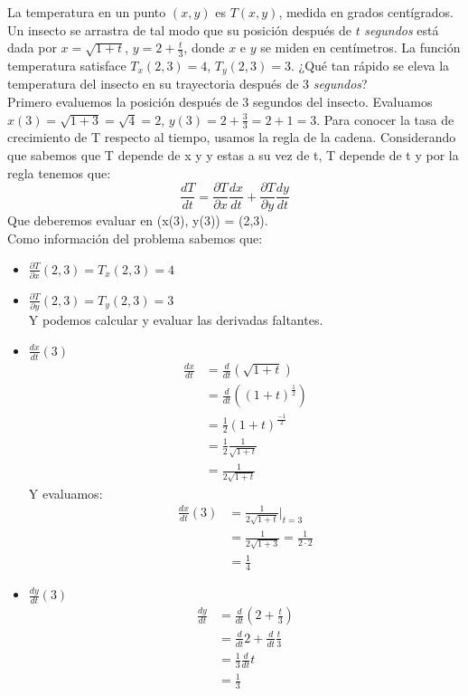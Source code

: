 \documentclass[12pt]{article}
\begin{document}
\begin{itemize}[format=\textbf]
La temperatura en un punto $(x, y)$ es $T(x, y)$, medida en grados centígrados. Un insecto se arrastra de tal modo que su posición después de $t$ \textit{segundos} está dada por $x =
\sqrt{1 + t}$, $y = 2 + \frac{t}{3}$, donde $x$ e $y$ se miden en centímetros. La función temperatura satisface $T_x(2, 3) = 4$, $T_y(2, 3) = 3$.
¿Qué tan rápido se eleva la temperatura del insecto en su trayectoria después de 3 \textit{segundos}?\\
Primero evaluemos la posición después de 3 segundos del insecto.
Evaluamos $x(3) =\sqrt{1 + 3} = \sqrt{4} = 2 $, $y(3) = 2 + \frac{3}{3} = 2+1=3 $. Para conocer la tasa de crecimiento de T respecto al tiempo, usamos la regla de la cadena. Considerando que sabemos que T depende de x y y estas a su vez de t, T depende de t y por la regla tenemos que:
\[
\frac{dT}{dt} = \frac{\partial T}{\partial x}\frac{dx}{dt}+ \frac{\partial T}{\partial y}\frac{dy}{dt}
\]
Que deberemos evaluar en (x(3), y(3)) = (2,3).\\
Como información del problema sabemos que:
\begin{itemize}
\item $\frac{\partial T}{\partial x}(2,3)= T_x(2, 3) = 4$
\item $ \frac{\partial T}{\partial y}(2,3) = T_y(2, 3) = 3 $\\
Y podemos calcular y evaluar las derivadas faltantes.
\item $\frac{dx}{dt}(3) $
    \begin{align*}
      \frac{dx}{dt} &= \frac{d}{dt} \left( \sqrt{1 + t} \right)  \\
      &=  \frac{d}{dt} \left( (1 + t)^{\frac{1}{2}}\right) \\
      &= \frac{1}{2} (1+t)^{\frac{-1}{2}}\\
      &=\frac{1}{2}  \frac{1}{  \sqrt{1 + t}} \\
      &= \frac{1}{2 \sqrt{1 + t} }  
    \end{align*}
    Y evaluamos:
    \begin{align*}
      \frac{dx}{dt}(3) &= \frac{1}{2 \sqrt{1 + t} } \big|_{t=3} \\
      &= \frac{1}{2 \sqrt{1 + 3}}= \frac{1}{2 \cdot 2 } \\
      &= \frac{1}{4}  
    \end{align*}
    
  \item $\frac{dy}{dt}(3)$
     \begin{align*}
      \frac{dy}{dt} &= \frac{d}{dt} \left(  2 + \frac{t}{3}  \right)  \\
      &= \frac{d}{dt} 2 + \frac{d}{dt}  \frac{t}{3} \\
      &= \frac{1}{3} \frac{d}{dt} t \\
      &= \frac{1}{3}
     \end{align*}


\end{itemize}
\end{itemize}
\end{document}
